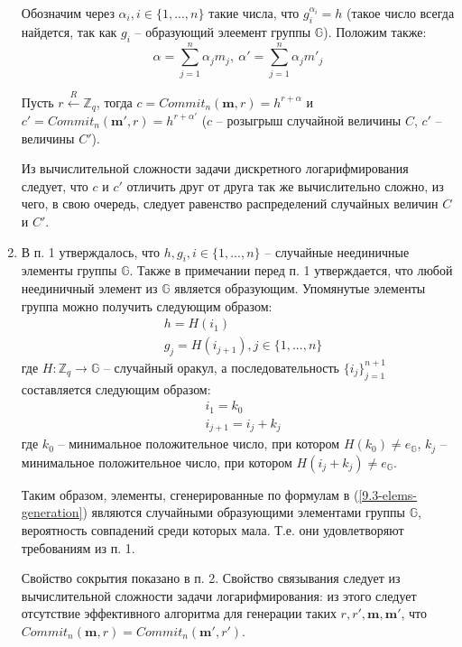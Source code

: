 \documentclass[12pt, a4paper]{extarticle}
\begin{document}
\begin{enumerate}
        Обозначим через $\alpha_i, i \in \{1, ..., n\}$ такие числа, что $g_i^{\alpha_i} = h$ (такое число всегда найдется,
        так как $g_i$ -- образующий элеемент группы $\mathbb{G}$). Положим также:
        \begin{equation*}
            \alpha = \sum_{j = 1}^{n} \alpha_j m_j,\ \alpha' = \sum_{j = 1}^{n} \alpha_j m'_j
        \end{equation*}
        
        Пусть $r \xleftarrow{R} \mathbb{Z}_q$, тогда $c = Commit_n(\mathbf{m}, r) = h^{r + \alpha}$ и $c' = 
        Commit_n(\mathbf{m'}, r) = h^{r + \alpha'}$ ($c$ -- розыгрыш случайной величины $C$, $c'$ -- величины $C'$).
        
        Из вычислительной сложности задачи дискретного логарифмирования следует, что $c$ и $c'$ отличить друг от друга
        так же вычислительно сложно, из чего, в свою очередь, следует равенство распределений случайных величин $C$ и $C'$.
        
    \item В п. 1 утверждалось, что $h, g_i, i \in \{1, ...,n\}$ -- случайные неединичные элементы группы $\mathbb{G}$. Также
        в примечании перед п. 1 утверждается, что любой неединичный элемент из $\mathbb{G}$ является образующим. Упомянутые
        элементы группа можно получить следующим образом:
        \begin{equation}
            \begin{split}
                & h = H(i_1) \\
                & g_j = H(i_{j + 1}), j \in \{1, ..., n\}
            \end{split}
            \label{9.3-elems-generation}
        \end{equation}
        где $H:\mathbb{Z}_q \to \mathbb{G}$ -- случайный оракул, а последовательность $\{i_j\}_{j=1}^{n+1}$ составляется
        следующим образом:
        \begin{equation*}
            \begin{split}
                & i_1 = k_0 \\
                & i_{j+1} = i_j + k_j
            \end{split}
        \end{equation*}
        где $k_0$ -- минимальное положительное число, при котором $H(k_0) \ne e_{\mathbb{G}}$, $k_j$ -- минимальное 
        положительное число, при котором $H(i_j + k_j) \ne e_{\mathbb{G}}$.
        
        Таким образом, элементы, сгенерированные по формулам в (\ref{9.3-elems-generation}) являются случайными образующими 
        элементами группы $\mathbb{G}$, вероятность совпадений среди которых мала. Т.е. они удовлетворяют требованиям из п. 1.
        
        Свойство сокрытия показано в п. 2. Свойство связывания следует из вычислительной сложности задачи логарифмирования: 
        из этого следует отсутствие эффективного алгоритма для генерации таких $r, r', \mathbf{m}, \mathbf{m'}$, что
        $Commit_n(\mathbf{m}, r) = Commit_n(\mathbf{m'}, r')$.
\end{enumerate}
\end{document}
